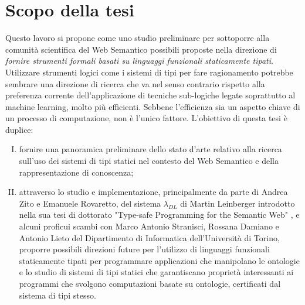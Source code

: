 \section{Scopo della tesi}
Questo lavoro si propone come uno studio preliminare per sottoporre alla comunità scientifica del Web Semantico possibili proposte nella direzione di \textsl{fornire strumenti formali basati su linguaggi funzionali staticamente tipati}. Utilizzare strumenti logici come i sistemi di tipi per fare ragionamento potrebbe sembrare una direzione di ricerca che va nel senso contrario rispetto alla preferenza corrente dell'applicazione di tecniche sub-logiche legate soprattutto al machine learning, molto più efficienti. Sebbene l'efficienza sia un aspetto chiave di un processo di computazione, non è l'unico fattore.
L'obiettivo di questa tesi è duplice: 
\begin{enumerate}[I)]
	\item fornire una panoramica preliminare dello stato d'arte relativo alla ricerca sull'uso dei sistemi di tipi statici nel contesto del Web Semantico e della rappresentazione di conoscenza;
	\label{itm:I}
	\item  attraverso lo studio e implementazione, principalmente da parte di Andrea Zito e Emanuele Rovaretto, del sistema $\lambda_{DL}$ di Martin Leinberger introdotto nella sua tesi di dottorato "Type-safe Programming for the Semantic Web" \cite{leinbergerphdthesis}, e alcuni proficui scambi con Marco Antonio Stranisci, Rossana Damiano e Antonio Lieto del Dipartimento di Informatica dell’Università di Torino, proporre possibili direzioni future per l’utilizzo di linguaggi funzionali staticamente tipati per programmare applicazioni che manipolano le ontologie e lo studio di sistemi di tipi statici che garantiscano proprietà interessanti ai programmi che svolgono computazioni basate su ontologie, certificati dal sistema di tipi stesso.
\end{enumerate}
\newpage
\noindent
